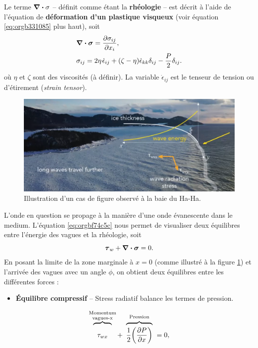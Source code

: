 \documentclass[10pt]{article}
\numberwithin{equation}{section}
\newcommand{\short}{\vphantom{pA}}
\newcommand{\tall}{\vphantom{pA^{x^x}_p}}
\newcommand{\venti}{\vphantom{\sum_x^x}}
\newcommand{\pt}{\hspace{1pt}} %
\begin{document}
Le terme \(\divergence{\sigma}\) -- définit comme étant la \textbf{rhéologie} -- est décrit à l'aide de l'équation de \textbf{déformation d'un plastique visqueux} \autocite{hunke1997elastic} (voir équation \ref{eq:orgb331085} plus haut), soit
\begin{align}
   & \divergence{\boldsymbol{\sigma}} = \pdv{\sigma_{ij}}{x_i},\\
   & \sigma_{ij} = 2\eta \pt\dot{\epsilon}_{ij} + \qty(\zeta - \eta) \dot{\epsilon}_{kk} \delta_{ij} - \frac{P}{2} \delta_{ij}.
\end{align}
où \(\eta\) et \(\zeta\) sont des viscosités (à définir).
La variable \(\dot{\epsilon}_{ij}\) est le tenseur de tension ou d'étirement (\emph{strain tensor}).\bigskip

\begin{figure}[htbp]
\centering
\includegraphics[width=.9\linewidth]{Figures/photos/glace-evanescente.png}
\caption{\label{fig:org64763e9}Illustration d'un cas de figure observé à la baie du Ha-Ha.}
\end{figure}

L'onde en question se propage à la manière d'une onde évanescente dans le medium.
L'équation \ref{eq:orgbf74c5c} nous permet de visualiser deux équilibres entre l'énergie des vagues et la rhéologie, soit
\begin{equation}
   \boldsymbol{\tau}_w + \divergence{\boldsymbol{\sigma}} = 0.
\end{equation}
En posant la limite de la zone marginale à \(x=0\) (comme illustré à la figure \ref{fig:org64763e9}) et l'arrivée des vagues avec un angle \(\phi\), on obtient deux équilibres entre les différentes forces :\bigskip

\begin{itemize}
\item \textbf{Équilibre compressif} -- Stress radiatif balance les termes de pression.
\end{itemize}
\begin{equation}
\label{eq:orgaa734a2}
   \overbrace{\venti\phantom{x}\tau_{wx}\phantom{x}}^{\substack{\text{Momentum}\short\\\text{vagues-x}\short}} +\ \overbrace{\venti\frac{1}{2}\qty(\pdv{P}{x})}^{\text{Pression}\tall}\ = 0,
\end{equation}
\end{document}
